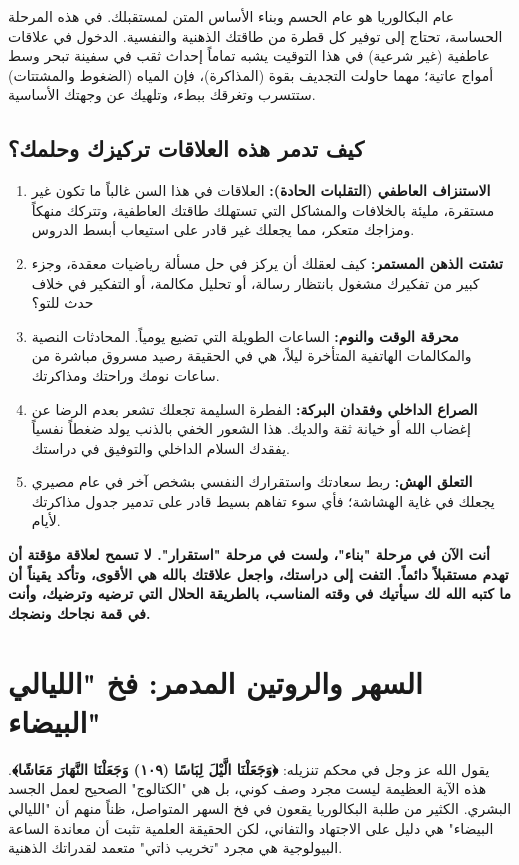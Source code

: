 \documentclass[12pt,a4paper]{book}
\newcommand{\importantAr}[1]{%
	\begin{important}
		\bfseries #1
	\end{important}
}
\begin{document}
	عام البكالوريا هو عام الحسم وبناء الأساس المتن لمستقبلك. في هذه المرحلة الحساسة، تحتاج إلى توفير كل قطرة من طاقتك الذهنية والنفسية. الدخول في علاقات عاطفية (غير شرعية) في هذا التوقيت يشبه تماماً إحداث ثقب في سفينة تبحر وسط أمواج عاتية؛ مهما حاولت التجديف بقوة (المذاكرة)، فإن المياه (الضغوط والمشتتات) ستتسرب وتغرقك ببطء، وتلهيك عن وجهتك الأساسية.
	

	
	\subsection*{كيف تدمر هذه العلاقات تركيزك وحلمك؟}
	\begin{enumerate}
		\item \textbf{الاستنزاف العاطفي (التقلبات الحادة):} العلاقات في هذا السن غالباً ما تكون غير مستقرة، مليئة بالخلافات والمشاكل التي تستهلك طاقتك العاطفية، وتتركك منهكاً ومزاجك متعكر، مما يجعلك غير قادر على استيعاب أبسط الدروس.
		\item \textbf{تشتت الذهن المستمر:} كيف لعقلك أن يركز في حل مسألة رياضيات معقدة، وجزء كبير من تفكيرك مشغول بانتظار رسالة، أو تحليل مكالمة، أو التفكير في خلاف حدث للتو؟ 
		\item \textbf{محرقة الوقت والنوم:} الساعات الطويلة التي تضيع يومياً.  المحادثات النصية والمكالمات الهاتفية المتأخرة ليلاً، هي في الحقيقة رصيد \newline مسروق مباشرة من ساعات نومك وراحتك ومذاكرتك.
		\item \textbf{الصراع الداخلي وفقدان البركة:} الفطرة السليمة تجعلك تشعر بعدم الرضا عن إغضاب الله أو خيانة ثقة والديك. هذا الشعور الخفي بالذنب يولد ضغطاً نفسياً يفقدك السلام الداخلي والتوفيق في دراستك.
		\item \textbf{التعلق الهش:} ربط سعادتك واستقرارك النفسي بشخص آخر في عام مصيري يجعلك في غاية الهشاشة؛ فأي سوء تفاهم بسيط قادر على تدمير جدول مذاكرتك لأيام.
	\end{enumerate}
	
	\importantAr{أنت الآن في مرحلة "بناء"، ولست في مرحلة "استقرار". لا تسمح لعلاقة مؤقتة أن تهدم مستقبلاً دائماً. التفت إلى دراستك، واجعل علاقتك بالله هي الأقوى، وتأكد يقيناً أن ما كتبه الله لك سيأتيك في وقته المناسب، بالطريقة الحلال التي ترضيه وترضيك، وأنت في قمة نجاحك ونضجك.}
	
	\section{السهر والروتين المدمر: فخ "الليالي البيضاء"}
	
	يقول الله عز وجل في محكم تنزيله: \textbf{﴿وَجَعَلْنَا الَّيْلَ لِبَاسًا (١٠٩) وَجَعَلْنَا النَّهَارَ مَعَاشًا﴾}. هذه الآية العظيمة ليست مجرد وصف كوني، بل هي "الكتالوج" الصحيح لعمل الجسد البشري. الكثير من طلبة البكالوريا يقعون في فخ السهر المتواصل، ظناً منهم أن "الليالي البيضاء" هي دليل على الاجتهاد والتفاني، لكن الحقيقة العلمية تثبت أن معاندة الساعة البيولوجية هي مجرد "تخريب ذاتي" متعمد لقدراتك الذهنية.
	
\end{document}
